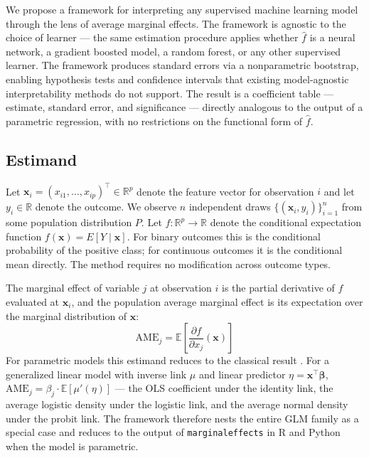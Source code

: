\documentclass[conference]{IEEEtran}
\begin{document}
	We propose a framework for interpreting any supervised machine learning model through the lens of average marginal effects. The framework is agnostic to the choice of learner --- the same estimation procedure applies whether $\hat{f}$ is a neural network, a gradient boosted model, a random forest, or any other supervised learner. The framework produces standard errors via a nonparametric bootstrap, enabling hypothesis tests and confidence intervals that existing model-agnostic interpretability methods do not support. The result is a coefficient table --- estimate, standard error, and significance --- directly analogous to the output of a parametric regression, with no restrictions on the functional form of $\hat{f}$.
	
	\subsection{Estimand}
	
	Let $\mathbf{x}_i = (x_{i1}, \dots, x_{ip})^\top \in \mathbb{R}^p$ denote the feature vector for observation $i$ and let $y_i \in \mathbb{R}$ denote the outcome. We observe $n$ independent draws $\{(\mathbf{x}_i, y_i)\}_{i=1}^n$ from some population distribution $P$. Let $f: \mathbb{R}^p \to \mathbb{R}$ denote the conditional expectation function $f(\mathbf{x}) = E[Y \mid \mathbf{x}]$. For binary outcomes this is the conditional probability of the positive class; for continuous outcomes it is the conditional mean directly. The method requires no modification across outcome types.
	
	The marginal effect of variable $j$ at observation $i$ is the partial derivative of $f$ evaluated at $\mathbf{x}_i$, and the population average marginal effect is its expectation over the marginal distribution of $\mathbf{x}$:
	\begin{equation}
		\mathrm{AME}_j = \mathbb{E}\left[\frac{\partial f}{\partial x_j}(\mathbf{x})\right]
	\end{equation}
	For parametric models this estimand reduces to the classical result \cite{greene2012, wooldridge2010}. For a generalized linear model with inverse link $\mu$ and linear predictor $\eta = \mathbf{x}^\top \boldsymbol{\beta}$, $\mathrm{AME}_j = \beta_j \cdot \mathbb{E}[\mu'(\eta)]$ --- the OLS coefficient under the identity link, the average logistic density under the logistic link, and the average normal density under the probit link. The framework therefore nests the entire GLM family as a special case and reduces to the output of \texttt{marginaleffects} in R and Python \cite{arelbundock2024marginaleffects} when the model is parametric.
	
\end{document}
